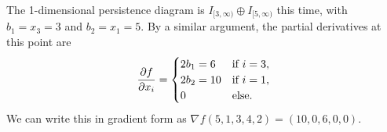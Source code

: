 \documentclass[twoside,10pt]{article}
\begin{document}
The 1-dimensional persistence diagram is $I_{[3,\infty)}\oplus I_{[5,\infty)}$ this time, with $b_1 = x_3 = 3$ and $b_2 = x_1 = 5$. By a similar argument, the partial derivatives at this point are
\[
\frac{\partial f}{\partial x_i} =
\begin{cases}
	2b_1 = 6 & \text{if } i=3,\\
	2b_2 = 10 & \text{if } i=1,\\
	0 & \text{else}.
\end{cases}
\] 
We can write this in gradient form as $\nabla_{}f(5,1,3,4,2) = (10, 0, 6, 0, 0)$.
\end{document}
